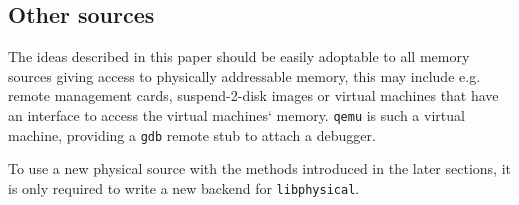 


\subsection{Other sources}

The ideas described in this paper should be easily adoptable to all memory
sources giving access to physically addressable memory, this may include e.g.
remote management cards, suspend-2-disk images or virtual machines that have an
interface to access the virtual machines` memory.  \texttt{qemu} is such a
virtual machine, providing a \texttt{gdb} remote stub to attach a debugger.

To use a new physical source with the methods introduced in the later sections,
it is only required to write a new backend for \texttt{libphysical}.

